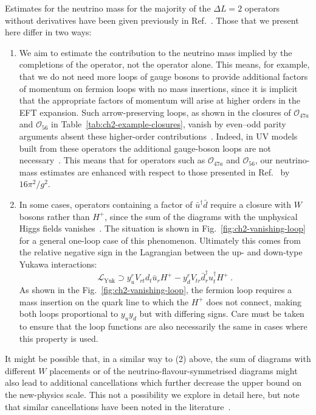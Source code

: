 Estimates for the neutrino mass for the majority of the $\Delta L = 2$ operators
without derivatives have been given previously in Ref.~\cite{deGouvea:2007qla}.
Those that we present here differ in two ways:
\begin{enumerate}
  \item We aim to estimate the contribution to the neutrino mass implied by the
    completions of the operator, not the operator alone. This means, for
    example, that we do not need more loops of gauge bosons to provide
    additional factors of momentum on fermion loops with no mass insertions,
    since it is implicit that the appropriate factors of momentum will arise at
    higher orders in the EFT expansion. Such arrow-preserving loops, as shown in
    the closures of $\mathcal{O}_{47a}$ and $\mathcal{O}_{56}$ in
    Table~\ref{tab:ch2-example-closures}, vanish by even--odd parity arguments
    absent these higher-order contributions~\cite{deGouvea:2007qla}. Indeed, in
    UV models built from these operators the additional gauge-boson loops are
    not necessary~\cite{Angel:2012ug, Gargalionis:2019drk}. This means that for
    operators such as $\mathcal{O}_{47a}$ and $\mathcal{O}_{56}$, our
    neutrino-mass estimates are enhanced with respect to those presented in
    Ref.~\cite{deGouvea:2007qla} by $16\pi^{2} / g^{2}$.
  \item In some cases, operators containing a factor of
    $\bar{u}^{\dagger} \bar{d}$ require a closure with $W$ bosons rather than
    $H^{+}$, since the sum of the diagrams with the unphysical Higgs fields
    vanishes~\cite{Babu:2010vp}. The situation is shown in
    Fig.~\ref{fig:ch2-vanishing-loop} for a general one-loop case of this
    phenomenon. Ultimately this comes from the relative negative sign in the
    Lagrangian between the up- and down-type Yukawa interactions:
    \begin{equation}
      \label{eq:ch2-sm-yukawa-negative}
    \mathscr{L}_{\text{Yuk}} \supset y_{u}^{r} V_{rt} d_{t} \bar{u}_{r} H^{+} - y_{d}^{r} V_{tr} \bar{d}^{\dagger}_{r} u^{\dagger}_{t} H^{+} \ .
  \end{equation}
    As shown in the Fig.~\ref{fig:ch2-vanishing-loop}, the fermion loop requires a
    mass insertion on the quark line to which the $H^{+}$ does not connect,
    making both loops proportional to $y_{u} y_{d}$ but with differing signs.
    Care must be taken to ensure that the loop functions are also necessarily
    the same in cases where this property is used.
\end{enumerate}
It might be possible that, in a similar way to (2) above, the sum of diagrams
with different $W$ placements or of the neutrino-flavour-symmetrised diagrams
might also lead to additional cancellations which further decrease the upper
bound on the new-physics scale. This not a possibility we explore in detail
here, but note that similar cancellations have been noted in the
literature~\cite{Gargalionis:2019drk}.

